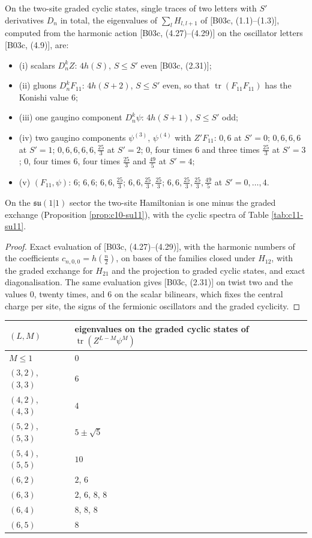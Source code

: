 \begin{proposition}
\label{prop:c11-targets}
On the two-site graded cyclic states, single traces of two letters with $S'$ derivatives $D_n$ in total, the eigenvalues of $\sum_lH_{l,l+1}$ of [B03c, (1.1)--(1.3)], computed from the harmonic action [B03c, (4.27)--(4.29)] on the oscillator letters [B03c, (4.9)], are:
\begin{itemize}
\item (i) scalars $D_n^kZ$: $4h(S)$, $S\le S'$ even [B03c, (2.31)];
\item (ii) gluons $D_n^kF_{11}$: $4h(S+2)$, $S\le S'$ even, so that $\operatorname{tr}(F_{11}F_{11})$ has the Konishi value $6$;
\item (iii) one gaugino component $D_n^k\psi$: $4h(S+1)$, $S\le S'$ odd;
\item (iv) two gaugino components $\psi^{(3)}$, $\psi^{(4)}$ with $Z'F_{11}$: $0,6$ at $S'=0$; $0,6,6,6$ at $S'=1$; $0,6,6,6,6,\tfrac{25}3$ at $S'=2$; $0$, four times $6$ and three times $\tfrac{25}3$ at $S'=3$; $0$, four times $6$, four times $\tfrac{25}3$ and $\tfrac{49}5$ at $S'=4$;
\item (v) $(F_{11},\psi)$: $6$; $6,6$; $6,6,\tfrac{25}3$; $6,6,\tfrac{25}3,\tfrac{25}3$; $6,6,\tfrac{25}3,\tfrac{25}3,\tfrac{49}5$ at $S'=0,\dots,4$.
\end{itemize}
On the $\mathfrak{su}(1|1)$ sector the two-site Hamiltonian is one minus the graded exchange (Proposition \ref{prop:c10-su11}), with the cyclic spectra of Table \ref{tab:c11-su11}.
\end{proposition}

\begin{proof}
Exact evaluation of [B03c, (4.27)--(4.29)], with the harmonic numbers of the coefficients $c_{n,0,0}=h(\tfrac n2)$, on bases of the families closed under $H_{12}$, with the graded exchange for $H_{21}$ and the projection to graded cyclic states, and exact diagonalisation. The same evaluation gives [B03c, (2.31)] on twist two and the values $0$, twenty times, and $6$ on the scalar bilinears, which fixes the central charge per site, the signs of the fermionic oscillators and the graded cyclicity.
\end{proof}

\begin{tabular}{l|l}
$(L,M)$ & eigenvalues on the graded cyclic states of $\operatorname{tr}(Z^{L-M}\psi^M)$\\
\hline
$M\le1$ & $0$\\
$(3,2)$, $(3,3)$ & $6$\\
$(4,2)$, $(4,3)$ & $4$\\
$(5,2)$, $(5,3)$ & $5\pm\sqrt5$\\
$(5,4)$, $(5,5)$ & $10$\\
$(6,2)$ & $2$, $6$\\
$(6,3)$ & $2$, $6$, $8$, $8$\\
$(6,4)$ & $8$, $8$, $8$\\
$(6,5)$ & $8$\\
\end{tabular}

